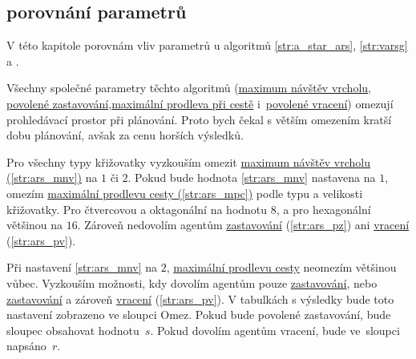 \subsection{ porovnání parametrů}\label{subsec:a_star_porovnani_parametru}

V této kapitole porovnám vliv parametrů u algoritmů \ref{str:a_star_ars}, \ref{str:varsg} a .

Všechny společné parametry těchto algoritmů (\hyperref[par:ars_mnv]{maximum návštěv vrcholu},
\hyperref[par:ars_pz]{povolené zastavování},\hyperref[par:ars_mpc]{maximální prodleva při cestě}
i~\hyperref[par:ars_pv]{povolené vracení}) omezují prohledávací prostor při plánování.
Proto bych čekal s větším omezením kratší dobu plánování, avšak za cenu horších výsledků.

Pro všechny typy křižovatky vyzkouším omezit \hyperref[par:ars_mnv]{maximum návštěv vrcholu (\ref{str:ars_mnv})}
na $1$ či $2$.
Pokud bude hodnota \ref{str:ars_mnv} nastavena na $1$, omezím
\hyperref[par:ars_mpc]{maximální prodlevu cesty (\ref{str:ars_mpc})} podle typu a velikosti křižovatky.
Pro čtvercovou a oktagonální na hodnotu $8$, a pro hexagonální většinou na $16$.
Zároveň nedovolím agentům \hyperref[par:ars_pz]{zastavování} (\ref{str:ars_pz})
ani \hyperref[par:ars_pv]{vracení} (\ref{str:ars_pv}).

Při nastavení \ref{str:ars_mnv} na $2$, \hyperref[par:ars_mpc]{maximální prodlevu cesty}
neomezím většinou vůbec.
Vyzkouším možnosti, kdy dovolím agentům pouze \hyperref[par:ars_pz]{zastavování},
nebo \hyperref[par:ars_pz]{zastavování} a zároveň \hyperref[par:ars_pv]{vracení} (\ref{str:ars_pv}).
V tabulkách s výsledky bude toto nastavení zobrazeno ve sloupci \textrm{Omez}.
Pokud bude povolené zastavování, bude sloupec obsahovat hodnotu~$s$.
Pokud dovolím agentům vracení, bude ve~sloupci napsáno~$r$.









